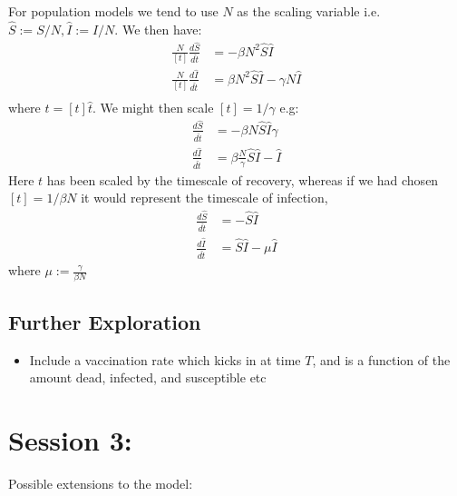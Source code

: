 \documentclass[a4paper,openany,nobib]{tufte-book}
\begin{document}
For population models we tend to use $N$ as the scaling variable i.e. $\hat S := S/N, \hat I := I/N$.
We then have:
\begin{align*}
	\frac{N}{[t]} \frac{d\hat S}{d\hat t} &= -\beta N^2 \hat S \hat I\\
	\frac{N}{[t]} \frac{d\hat I}{d\hat t} &= \beta N^2 \hat S \hat I - \gamma N \hat I\\
\end{align*}
where $t = [t]\hat t$.
We might then scale $[t] = 1/\gamma$ e.g:
\begin{align*}
	\frac{d\hat S}{d\hat t} &= -\beta N \hat S \hat I \gamma\\
	 \frac{d\hat I}{d\hat t} &= \beta \frac{N}{\gamma}  \hat S \hat I -  \hat I
\end{align*}
Here $t$ has been scaled by the timescale of recovery, whereas if we had chosen $[t] = 1/\beta N$ it would represent the timescale of infection,
\begin{align}
	\label{eq:nd1}
	\frac{d\hat S}{d\hat t} &= -\hat S \hat I\\
	\label{eq:nd2}
	 \frac{d\hat I}{d\hat t} &= \hat S \hat I - \mu \hat I
\end{align}
where $\mu := \frac{\gamma}{\beta N}$ 

\subsection{Further Exploration}%
\label{sub:Further Exploration}

\begin{itemize}
	\item Include a vaccination rate which kicks in at time $T$, and is a function of the amount dead, infected, and susceptible etc
\end{itemize}
\section{Session 3:}%
\label{sec:Session 3:}
Possible extensions to the model:
\end{document}
